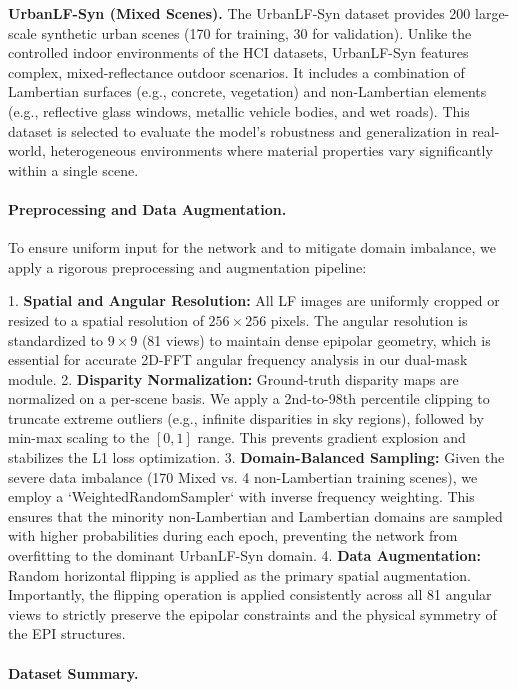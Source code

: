 \textbf{UrbanLF-Syn (Mixed Scenes).} 
The UrbanLF-Syn  dataset provides 200 large-scale synthetic urban scenes (170 for training, 30 for validation). Unlike the controlled indoor environments of the HCI datasets, UrbanLF-Syn features complex, mixed-reflectance outdoor scenarios. It includes a combination of Lambertian surfaces (e.g., concrete, vegetation) and non-Lambertian elements (e.g., reflective glass windows, metallic vehicle bodies, and wet roads). This dataset is selected to evaluate the model's robustness and generalization in real-world, heterogeneous environments where material properties vary significantly within a single scene.

\paragraph{Preprocessing and Data Augmentation.}

To ensure uniform input for the network and to mitigate domain imbalance, we apply a rigorous preprocessing and augmentation pipeline:

1. \textbf{Spatial and Angular Resolution:} All LF images are uniformly cropped or resized to a spatial resolution of $256 \times 256$ pixels. The angular resolution is standardized to $9 \times 9$ (81 views) to maintain dense epipolar geometry, which is essential for accurate 2D-FFT angular frequency analysis in our dual-mask module.
2. \textbf{Disparity Normalization:} Ground-truth disparity maps are normalized on a per-scene basis. We apply a 2nd-to-98th percentile clipping to truncate extreme outliers (e.g., infinite disparities in sky regions), followed by min-max scaling to the $[0, 1]$ range. This prevents gradient explosion and stabilizes the L1 loss optimization.
3. \textbf{Domain-Balanced Sampling:} Given the severe data imbalance (170 Mixed vs. 4 non-Lambertian training scenes), we employ a `WeightedRandomSampler` with inverse frequency weighting. This ensures that the minority non-Lambertian and Lambertian domains are sampled with higher probabilities during each epoch, preventing the network from overfitting to the dominant UrbanLF-Syn domain.
4. \textbf{Data Augmentation:} Random horizontal flipping is applied as the primary spatial augmentation. Importantly, the flipping operation is applied consistently across all 81 angular views to strictly preserve the epipolar constraints and the physical symmetry of the EPI structures.

\paragraph{Dataset Summary.}

